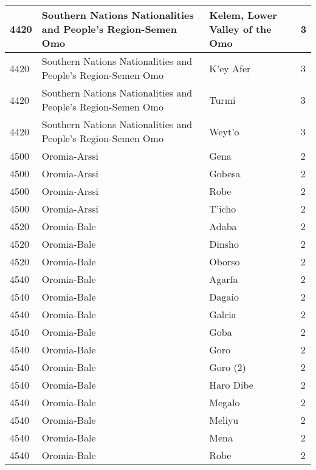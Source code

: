 \documentclass[12pt,a4paper,openbib,titlepage]{report}
\begin{document}
\begin{longtable}{|p{2cm}|p{6.5cm}|p{8cm}|p{1.5cm}|}
\hline 
\rule[-1ex]{0pt}{2.5ex} 4420 & Southern Nations Nationalities and People's Region-Semen Omo & Kelem, Lower Valley of the Omo & 3 \\
\hline 
\rule[-1ex]{0pt}{2.5ex} 4420 & Southern Nations Nationalities and People's Region-Semen Omo & K'ey Afer & 3 \\ 
\hline 
\rule[-1ex]{0pt}{2.5ex} 4420 & Southern Nations Nationalities and People's Region-Semen Omo & Turmi & 3 \\ 
\hline 
\rule[-1ex]{0pt}{2.5ex} 4420 & Southern Nations Nationalities and People's Region-Semen Omo & Weyt'o & 3 \\ 
\hline 
\rule[-1ex]{0pt}{2.5ex} 4500 & Oromia-Arssi & Gena & 2 \\ 
\hline 
\rule[-1ex]{0pt}{2.5ex} 4500 & Oromia-Arssi & Gobesa & 2 \\ 
\hline 
\rule[-1ex]{0pt}{2.5ex} 4500 & Oromia-Arssi & Robe & 2 \\  
\hline 
\rule[-1ex]{0pt}{2.5ex} 4500 & Oromia-Arssi & T'icho & 2 \\ 
\hline 
\rule[-1ex]{0pt}{2.5ex} 4520 & Oromia-Bale & Adaba & 2 \\ 
\hline 
\rule[-1ex]{0pt}{2.5ex} 4520 & Oromia-Bale & Dinsho & 2 \\ 
\hline 
\rule[-1ex]{0pt}{2.5ex} 4520 & Oromia-Bale & Oborso & 2 \\ 
\hline 
\rule[-1ex]{0pt}{2.5ex} 4540 & Oromia-Bale & Agarfa & 2 \\ 
\hline 
\rule[-1ex]{0pt}{2.5ex} 4540 & Oromia-Bale & Dagaio & 2 \\ 
\hline 
\rule[-1ex]{0pt}{2.5ex} 4540 & Oromia-Bale & Galcia & 2 \\ 
\hline 
\rule[-1ex]{0pt}{2.5ex} 4540 & Oromia-Bale & Goba & 2 \\ 
\hline 
\rule[-1ex]{0pt}{2.5ex} 4540 & Oromia-Bale & Goro & 2 \\ 
\hline 
\rule[-1ex]{0pt}{2.5ex} 4540 & Oromia-Bale & Goro (2) & 2 \\ 
\hline 
\rule[-1ex]{0pt}{2.5ex} 4540 & Oromia-Bale & Haro Dibe & 2 \\ 
\hline 
\rule[-1ex]{0pt}{2.5ex} 4540 & Oromia-Bale & Megalo & 2 \\ 
\hline 
\rule[-1ex]{0pt}{2.5ex} 4540 & Oromia-Bale & Meliyu & 2 \\ 
\hline 
\rule[-1ex]{0pt}{2.5ex} 4540 & Oromia-Bale & Mena & 2 \\ 
\hline 
\rule[-1ex]{0pt}{2.5ex} 4540 & Oromia-Bale & Robe & 2 \\ 
\hline 

\end{longtable}
\end{document}
